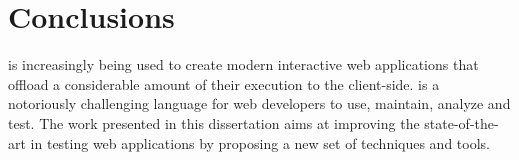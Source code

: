 \chapter{Conclusions} \label{Chap:conc}
\javascript is increasingly being used to create modern interactive web applications that offload a considerable amount of their execution to the client-side. \javascript is a notoriously challenging language for web developers to use, maintain, analyze and test. %
The work presented in this dissertation aims at improving the state-of-the-art in testing \javascript web applications by proposing a new set of techniques and tools.

